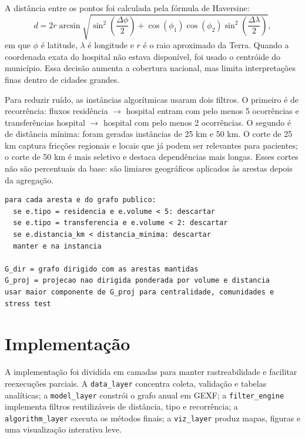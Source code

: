 \documentclass[10pt,a4paper]{article}
\begin{document}
A distância entre os pontos foi calculada pela fórmula de Haversine:
\begin{equation}
d = 2r \arcsin \sqrt{
\sin^2\left(\frac{\Delta \phi}{2}\right) +
\cos(\phi_1)\cos(\phi_2)\sin^2\left(\frac{\Delta \lambda}{2}\right)
},
\label{eq:haversine}
\end{equation}
em que $\phi$ é latitude, $\lambda$ é longitude e $r$ é o raio aproximado da Terra. Quando a coordenada exata do hospital não estava disponível, foi usado o centróide do município. Essa decisão aumenta a cobertura nacional, mas limita interpretações finas dentro de cidades grandes.

Para reduzir ruído, as instâncias algorítmicas usaram dois filtros. O primeiro é de recorrência: fluxos residência $\rightarrow$ hospital entram com pelo menos 5 ocorrências e transferências hospital $\rightarrow$ hospital com pelo menos 2 ocorrências. O segundo é de distância mínima: foram geradas instâncias de 25 km e 50 km. O corte de 25 km captura fricções regionais e locais que já podem ser relevantes para pacientes; o corte de 50 km é mais seletivo e destaca dependências mais longas. Esses cortes não são percentuais da base: são limiares geográficos aplicados às arestas depois da agregação.

\begin{lstlisting}[caption={Construção da instância analítica filtrada.}]
para cada aresta e do grafo publico:
  se e.tipo = residencia e e.volume < 5: descartar
  se e.tipo = transferencia e e.volume < 2: descartar
  se e.distancia_km < distancia_minima: descartar
  manter e na instancia

G_dir = grafo dirigido com as arestas mantidas
G_proj = projecao nao dirigida ponderada por volume e distancia
usar maior componente de G_proj para centralidade, comunidades e stress test
\end{lstlisting}

\section{Implementação}

A implementação foi dividida em camadas para manter rastreabilidade e facilitar reexecuções parciais. A \texttt{data\_layer} concentra coleta, validação e tabelas analíticas; a \texttt{model\_layer} constrói o grafo anual em GEXF; a \texttt{filter\_engine} implementa filtros reutilizáveis de distância, tipo e recorrência; a \texttt{algorithm\_layer} executa os métodos finais; a \texttt{viz\_layer} produz mapas, figuras e uma visualização interativa leve.
\end{document}
